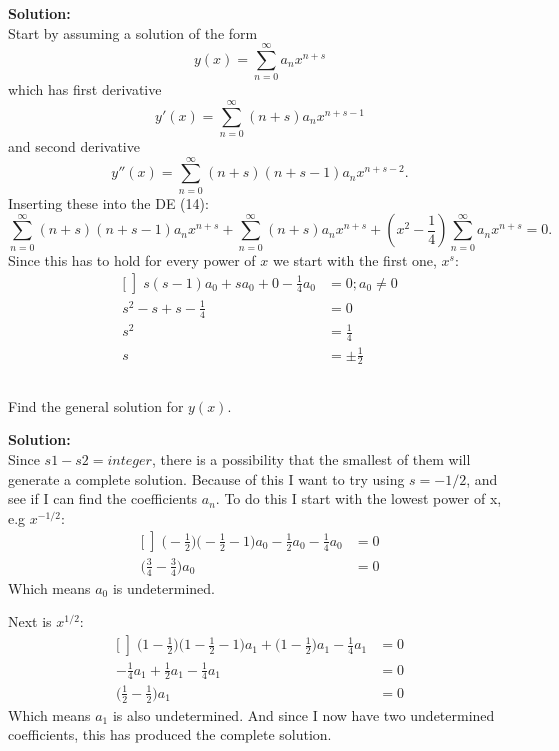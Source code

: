 \documentclass[a4paper,12pt]{article}
\begin{document}
\textbf{Solution:}\\
Start by assuming a solution of the form
$$y(x) = \sum_{n=0}^\infty a_nx^{n+s}$$
which has first derivative
$$y'(x) = \sum_{n=0}^\infty (n+s)a_nx^{n+s-1}$$
and second derivative
$$y''(x) = \sum_{n=0}^\infty (n+s)(n+s-1)a_nx^{n+s-2}.$$
Inserting these into the DE (14):
\begin{equation*}
\sum_{n=0}^\infty (n+s)(n+s-1)a_nx^{n+s} + \sum_{n=0}^\infty (n+s)a_nx^{n+s} + (x^2-\frac{1}{4})\sum_{n=0}^\infty a_nx^{n+s} = 0.
\end{equation*}
Since this has to hold for every power of $x$ we start with the first one, $x^s:$
\begin{equation*}
\begin{aligned}[\left]
s(s-1)a_0 + sa_0 + 0 -\frac{1}{4}a_0 &= 0 ; a_0 \neq 0 \\
s^2 -s +s - \frac{1}{4}  &= 0 \\
s^2 &= \frac{1}{4}\\
s  &= \pm\frac{1}{2} 
\end{aligned}
\end{equation*}

\subsection{}
Find the general solution for $y(x)$.

\textbf{Solution:}\\
Since $s1-s2 = integer$, there is a possibility that the smallest of them will generate a complete solution.
Because of this I want to try using $s = -1/2$, and see if I can find the coefficients $a_n$. 
To do this I start with the lowest power of x, e.g $x^{-1/2}$:
\begin{equation*}
\begin{aligned}[\left]
\bigg(-\frac{1}{2}\bigg)\bigg(-\frac{1}{2}-1\bigg)a_0 - \frac{1}{2}a_0 - \frac{1}{4}a_0 &= 0\\
\bigg(\frac{3}{4} - \frac{3}{4}\bigg)a_0 &= 0
\end{aligned}
\end{equation*}
Which means $a_0$ is undetermined.

Next is $x^{1/2}$:
\begin{equation*}
\begin{aligned}[\left]
\bigg(1-\frac{1}{2} \bigg)\bigg(1-\frac{1}{2}-1\bigg)a_1 + \bigg(1-\frac{1}{2}\bigg)a_1 -\frac{1}{4}a_1 &= 0\\
-\frac{1}{4}a_1 +\frac{1}{2}a_1 -\frac{1}{4}a_1 &= 0  \\
\bigg(\frac{1}{2}-\frac{1}{2} \bigg)a_1 &= 0
\end{aligned}
\end{equation*}
Which means $a_1$ is also undetermined. And since I now have two undetermined coefficients, this has produced the complete solution.
\end{document}
